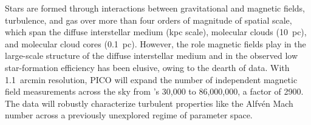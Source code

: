 \documentclass[PICOAPC.tex]{subfiles}
\begin{document}
Stars are formed through interactions between gravitational and magnetic fields, turbulence, and gas over more than four orders of magnitude of spatial scale, which span the diffuse interstellar medium (kpc scale), molecular clouds (10~pc), and molecular cloud cores (0.1~pc). However, the role magnetic fields play in the large-scale structure of the diffuse interstellar medium and in the observed low star-formation efficiency has been elusive, owing to the dearth of data. 
With 1.1~arcmin resolution, PICO will expand the number of independent magnetic field measurements across the sky from \planck 's  30,000 to 86,000,000, a factor of 2900. The data will robustly characterize turbulent properties like the Alfv\'{e}n Mach number across a previously unexplored regime of parameter space. 
\end{document}
